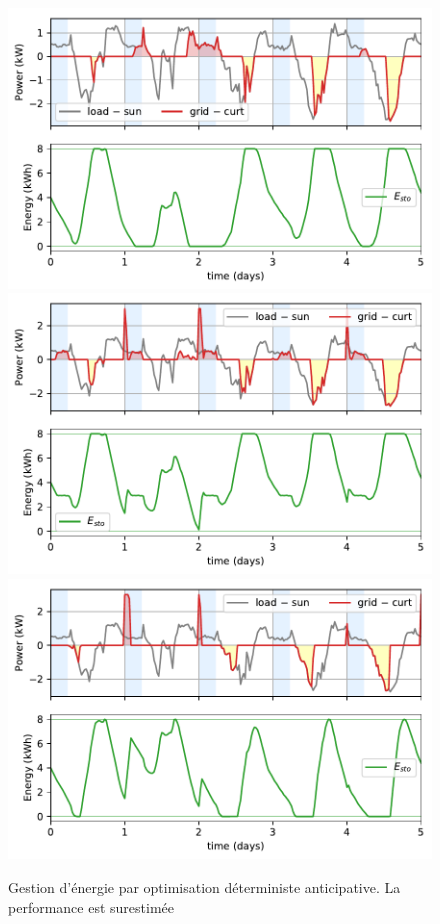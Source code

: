 \documentclass[a4paper,10pt,twocolumn]{article}
\begin{document}
\begin{figure}[!ht]
  \begin{center}
    \includegraphics[width=1\columnwidth]{figures/matlab_rule-based.pdf}
    \includegraphics[width=1\columnwidth]{figures/matlab_mpc.pdf}
    \includegraphics[width=1\columnwidth]{figures/julia_anticipative.pdf}
  \end{center}

  \caption{Gestion d'énergie par optimisation déterministe anticipative. La performance est surestimée
  }
  \label{fig:anticip}
\end{figure}
\end{document}
